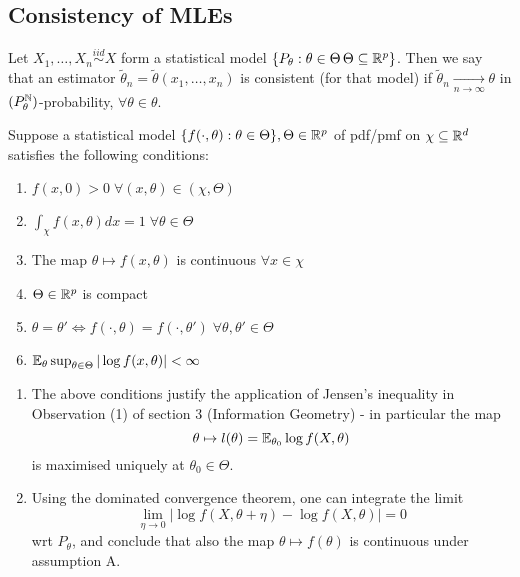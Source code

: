 \documentclass[a4paper]{article}
\begin{document}
\subsection{Consistency of MLEs}

\begin{defn}
	Let $X_1, \ldots, X_n \stackrel{iid}{\sim} X$ form a statistical model $\{P_{\theta} : \theta \in \Theta\, \Theta \subseteq \mathbb{R}^{p}\}$. Then we say that an estimator $\tilde{\theta}_{n} = \tilde{\theta}(x_1, \ldots, x_n)$ is consistent (for that model) if $\tilde{\theta}_n \underset{n\to \infty}{\to} \theta$ in $(P_\theta^{\mathbb{N}})$-probability, $\forall \theta \in \theta$.
\end{defn}

\begin{assumption}
	Suppose a statistical model $\{f (\cdot , \theta) : \theta \in \Theta \}, \Theta \in \mathbb{R}^{p}$ of pdf/pmf on $\chi \subseteq \mathbb{R}^{d}$ satisfies the following conditions:

\begin{enumerate}
	\item $f(x,0) > 0 \; \forall (x, \theta) \in  (\chi, \Theta)$
	\item $\int_{\chi} f(x,\theta) dx = 1 \; \forall \theta \in \Theta$
	\item The map $\theta \mapsto f(x, \theta)$ is continuous $\forall x \in  \chi$
	\item  $\Theta \in \mathbb{R}^{p}$ is compact
	\item $\theta = \theta' \iff f(\cdot , \theta) = f(\cdot , \theta') \; \forall \theta, \theta' \in \Theta $
	\item $\mathbb{E}_{\theta} \sup_{\theta \in \Theta} |\log f(x, \theta)| < \infty$
\end{enumerate}

\end{assumption}

\begin{remark}
	\begin{enumerate}
		\item The above conditions justify the application of Jensen's inequality in Observation (1) of section 3 (Information Geometry) - in particular the map 
			\[\theta \mapsto l(\theta) = \mathbb{E}_{\theta_0} \log f(X, \theta)\] is maximised uniquely at $\theta_0 \in \Theta$.
		\item Using the dominated convergence theorem, one can integrate the limit
			\[
				\lim_{\eta \to  0} |\log f(X, \theta + \eta) - \log f(X, \theta)| = 0
			\] wrt $P_\theta$, and conclude that also the map $\theta \mapsto f(\theta)$ is continuous under assumption A.
	\end{enumerate}
\end{remark}
\end{document}
